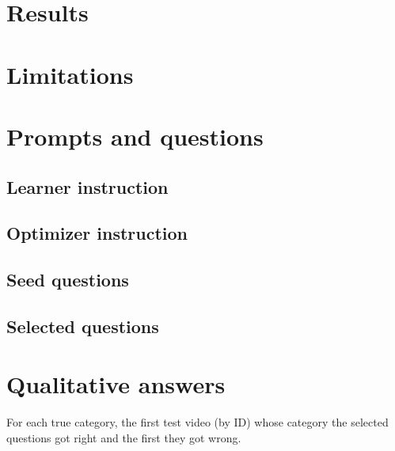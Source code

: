 \documentclass[11pt]{article}
\begin{document}
\section{Results}



\section{Limitations}





\appendix
\section{Prompts and questions}\label{app:prompts}
\subsection*{Learner instruction}

\subsection*{Optimizer instruction}

\subsection*{Seed questions}

\subsection*{Selected questions}



\section{Qualitative answers}\label{app:cases}
For each true category, the first test video (by ID) whose category the selected questions got right and the first they got wrong.

\end{document}
